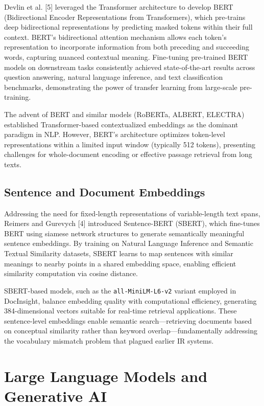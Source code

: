 Devlin et al. [5] leveraged the Transformer architecture to develop BERT (Bidirectional Encoder Representations from Transformers), which pre-trains deep bidirectional representations by predicting masked tokens within their full context. BERT's bidirectional attention mechanism allows each token's representation to incorporate information from both preceding and succeeding words, capturing nuanced contextual meaning. Fine-tuning pre-trained BERT models on downstream tasks consistently achieved state-of-the-art results across question answering, natural language inference, and text classification benchmarks, demonstrating the power of transfer learning from large-scale pre-training.

The advent of BERT and similar models (RoBERTa, ALBERT, ELECTRA) established Transformer-based contextualized embeddings as the dominant paradigm in NLP. However, BERT's architecture optimizes token-level representations within a limited input window (typically 512 tokens), presenting challenges for whole-document encoding or effective passage retrieval from long texts.

\subsection{Sentence and Document Embeddings}

Addressing the need for fixed-length representations of variable-length text spans, Reimers and Gurevych [4] introduced Sentence-BERT (SBERT), which fine-tunes BERT using siamese network structures to generate semantically meaningful sentence embeddings. By training on Natural Language Inference and Semantic Textual Similarity datasets, SBERT learns to map sentences with similar meanings to nearby points in a shared embedding space, enabling efficient similarity computation via cosine distance.

SBERT-based models, such as the \texttt{all-MiniLM-L6-v2} variant employed in DocInsight, balance embedding quality with computational efficiency, generating 384-dimensional vectors suitable for real-time retrieval applications. These sentence-level embeddings enable semantic search---retrieving documents based on conceptual similarity rather than keyword overlap---fundamentally addressing the vocabulary mismatch problem that plagued earlier IR systems.

\section{Large Language Models and Generative AI}

